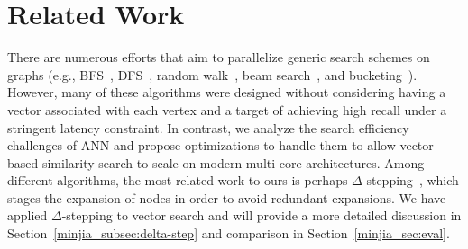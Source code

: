 \section{Related Work}\label{minjia_sec:related}

There are numerous efforts that aim to parallelize generic search schemes on graphs (e.g., BFS~\cite{shun2013ligra}, DFS~\cite{naumov2017parallel}, random walk~\cite{talati2021deep}, beam search~\cite{meister2020best}, and bucketing~\cite{sridhar2019delta,zhang2020optimizing}). However, many of these algorithms were designed without considering having a vector associated with each vertex and a target of achieving high recall under a stringent latency constraint. In contrast, we analyze the search efficiency challenges of ANN and propose optimizations to handle them to allow vector-based similarity search to scale on modern multi-core architectures. Among different algorithms, the most related work to ours is perhaps $\Delta$-stepping~\cite{zhang2020optimizing}, which stages the expansion of nodes in order to avoid redundant expansions. We have applied $\Delta$-stepping to vector search and will provide a more detailed discussion in Section~\ref{minjia_subsec:delta-step} and comparison in Section~\ref{minjia_sec:eval}.

